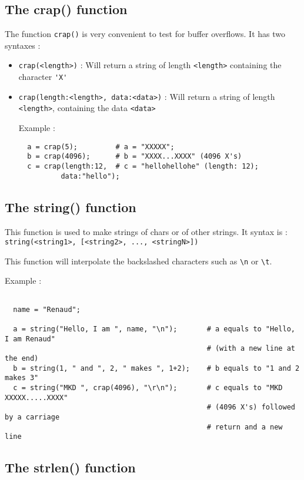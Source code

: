 \documentclass{article}
\begin{document}
\subsection{The crap() function}

 The function \verb+crap()+ is very convenient to test for buffer overflows.
 It has two syntaxes :
 \begin{itemize}
 \item \verb+crap(<length>)+ : Will return a string of length \verb+<length>+ 
containing the character \verb+'X'+

 \item \verb+crap(length:<length>, data:<data>)+ : Will return a string of length
 \verb+<length>+, containing the data \verb+<data>+
 
 Example :
\begin{verbatim}
  a = crap(5);         # a = "XXXXX";
  b = crap(4096);      # b = "XXXX...XXXX" (4096 X's)
  c = crap(length:12,  # c = "hellohellohe" (length: 12);
          data:"hello");           
\end{verbatim}

\end{itemize}
\subsection{The string() function}

 This function is used to make strings of chars or of other strings.
 It syntax is : \verb+string(<string1>, [<string2>, ..., <stringN>])+
 
 This function will interpolate the backslashed characters such as \verb+\n+ or
 \verb+\t+.
 
 Example :
\begin{verbatim}

  name = "Renaud";
    
  a = string("Hello, I am ", name, "\n");       # a equals to "Hello, I am Renaud" 
                                                # (with a new line at the end)
  b = string(1, " and ", 2, " makes ", 1+2);    # b equals to "1 and 2 makes 3"
  c = string("MKD ", crap(4096), "\r\n");       # c equals to "MKD XXXXX.....XXXX"
                                                # (4096 X's) followed by a carriage
                                                # return and a new line

\end{verbatim}

\subsection{The strlen() function}
\end{document}
